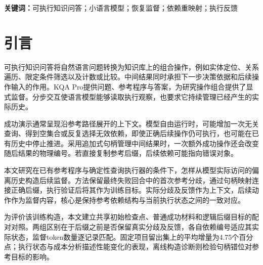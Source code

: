 \begin{abstract}
小语言模型在多步知识查询中需要根据自身生成的历史继续求解。额外的合法操作既可能改变后续决策上下文，也会占用中间结果句柄，使直接接入参考程序后缀产生依赖错位。本文提出面向可执行知识问答的依赖一致恢复监督构造方法：由固定初始模型采集训练失败，保留共同成功前缀与一次实际分歧，通过句柄重映射接入参考后缀，并以执行重放核验训练目标。模型读取保留的偏离历史，损失集中于后续助手动作。基于Qwen2.5-3B-Instruct与LoRA，在相同初始化、成功材料、问题顺序及监督token预算下比较普通续训与恢复续训。在KQA Pro的2000题项目留出集上，两个配对续训种子的平均准确率由78.75\%提高至83.50\%，增加4.75个百分点，题级配对bootstrap的95\%区间为$[3.53,5.98]$。恢复组减少未完成回合和无效调用，相对配对分步基线的累计推理token分别下降8.84\%和4.17\%。保存训练历史上的另行离线构造诊断进一步揭示了原编号直接拼接的依赖失配。结果支持在确定性只读查询环境中利用参考程序构造恢复监督。
\end{abstract}

\noindent\textbf{关键词：}可执行知识问答；小语言模型；恢复监督；依赖重映射；执行反馈

\section{引言}

可执行知识问答将自然语言问题转换为知识库上的组合操作，例如实体定位、关系遍历、限定条件筛选以及计数或比较。中间结果同时承担下一步决策依据和后续操作输入的作用。KQA Pro提供问题、参考程序与答案，为研究操作组合提供了显式监督\cite{cao2022kqapro}。分步交互使语言模型能够读取执行观察\cite{yao2023react}，也要求它持续管理已经产生的实际历史。

成功演示通常呈现沿参考路径展开的上下文。模型自由运行时，可能增加一次无关查询、得到空集合或反复选择无效依赖，即使正确后续操作仍可执行，也可能在已有历史中停止推进。采用追加式句柄管理中间结果时，一次额外成功操作还会改变随后结果的物理编号。若直接复制参考后缀，后续依赖可能指向错误对象。

本文研究在已有参考程序与确定性查询执行器的条件下，怎样从模型实际访问的偏离历史构造后续监督。方法保留最终失败回合中的首次参考分歧，通过句柄映射连接正确后缀，执行验证后将其作为训练目标。实际分歧及反馈作为上下文，后续动作作为监督内容，核心是保持参考依赖结构与当前执行状态之间的一致对应。

为评价该训练构造，本文建立共享初始检查点、普通成功材料和逻辑后缀目标的配对对照。两组区别在于后缀之前是否保留真实分歧及反馈，各自依赖编号适应其实际状态，监督token数量逐记录匹配。固定项目留出集上的平均增量为4.75个百分点；执行状态与成本分析描述性能变化的表现，离线构造诊断则检验句柄错位对参考目标的影响。

